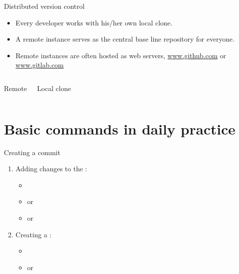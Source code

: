 \begin{frame}{Distributed version control}
\begin{itemize}
\item Every developer works with his/her own local clone.
\item A remote instance serves as the central base line repository for everyone.
\item Remote instances are often hosted as web servers, {\eg} \url{www.github.com} or \url{www.gitlab.com}
\end{itemize}

\begin{columns}
\begin{block}{Remote}
\vspace{14em}
\end{block}
\begin{block}{Local clone}
\vspace{14em}
\end{block}
\end{columns}
\end{frame}

\section{Basic commands in daily practice}

\begin{frame}{Creating a commit}
\begin{enumerate}
\item Adding changes to the :
\begin{itemize}
\item {}
\item {} or 
\item {} or 
\end{itemize}
\item Creating a :
\begin{itemize}
\item {}
\item {} or 
\end{itemize}
\end{enumerate}
\end{frame}

